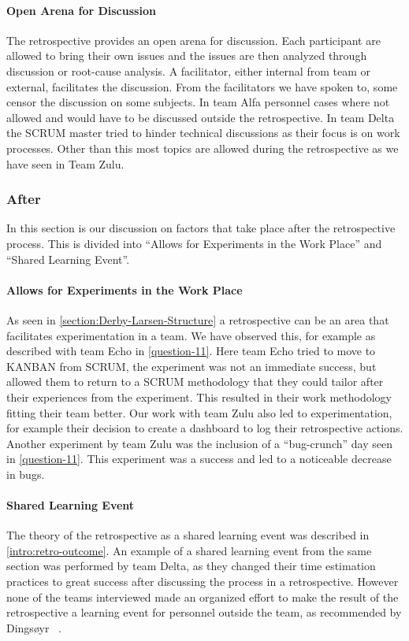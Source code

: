 \paragraph{Open Arena for Discussion}
The retrospective provides an open arena for discussion. Each participant are allowed to bring their own issues and the issues are then analyzed through discussion or root-cause analysis. A facilitator, either internal from team or external, facilitates the discussion. From the facilitators we have spoken to, some censor the discussion on some subjects. In team Alfa personnel cases where not allowed and would have to be discussed outside the retrospective. In team Delta the SCRUM master tried to hinder technical discussions as their focus is on work processes. Other than this most topics are allowed during the retrospective as we have seen in Team Zulu. 

\subsubsection{After}
In this section is our discussion on factors that take place after the retrospective process. This is divided into ``Allows for Experiments in the Work Place'' and ``Shared Learning Event''. 

\paragraph{Allows for Experiments in the Work Place}
\label{section:experiments-in-work-place}
As seen in \autoref{section:Derby-Larsen-Structure} a retrospective can be an area that facilitates experimentation in a team. We have observed this, for example as described with team Echo in \autoref{question-11}. Here team Echo tried to move to KANBAN from SCRUM, the experiment was not an immediate success, but allowed them to return to a SCRUM methodology that they could tailor after their experiences from the experiment. This resulted in their work methodology fitting their team better. Our work with team Zulu also led to experimentation, for example their decision to create a dashboard to log their retrospective actions. Another experiment by team Zulu was the inclusion of a ``bug-crunch'' day seen in \autoref{question-11}. This experiment was a success and led to a noticeable decrease in bugs.

\paragraph{Shared Learning Event}
The theory of the retrospective as a shared learning event was described in \autoref{intro:retro-outcome}.  An example of a shared learning event from the same section was performed by team Delta, as they changed their time estimation practices to great success after discussing the process in a retrospective. However none of the teams interviewed made an organized effort to make the result of the retrospective a learning event for personnel outside the team, as recommended by Dingsøyr ~\cite{Dingsoyr2004}.


